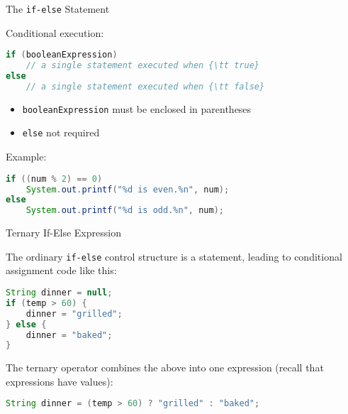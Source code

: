\documentclass{beamer}
\begin{document}
\begin{frame}[fragile]{The {\tt if-else} Statement}


Conditional execution:
\begin{lstlisting}[language=Java]
if (booleanExpression)
    // a single statement executed when {\tt true}
else
    // a single statement executed when {\tt false}
\end{lstlisting}
\vspace{-.1in}
\begin{itemize}
\item {\tt booleanExpression} must be enclosed in parentheses
\item {\tt else} not required
\end{itemize}
\vspace{-.1in}
Example:
\begin{lstlisting}[language=Java]
if ((num % 2) == 0)
    System.out.printf("%d is even.%n", num);
else
    System.out.printf("%d is odd.%n", num);
\end{lstlisting}

\end{frame}

\begin{frame}[fragile]{Ternary If-Else Expression}


The ordinary {\tt if-else} control structure is a statement, leading
to conditional assignment code like this: 
\begin{lstlisting}[language=Java]
String dinner = null;
if (temp > 60) {
    dinner = "grilled";
} else {
    dinner = "baked";
}
\end{lstlisting}

The ternary operator combines the above into one expression (recall
that expressions have values):

\begin{lstlisting}[language=Java]
String dinner = (temp > 60) ? "grilled" : "baked";
\end{lstlisting}

\end{frame}
\end{document}
